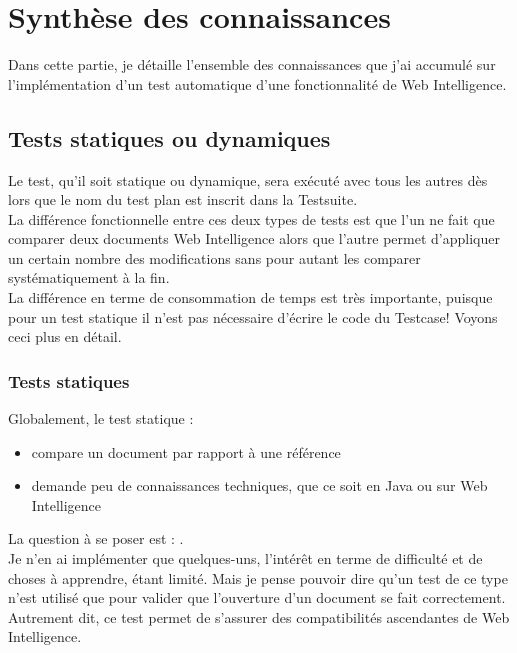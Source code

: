 

\section{Synth\`{e}se des connaissances}
Dans cette partie, je d\'{e}taille l'ensemble des connaissances que j'ai accumul\'{e} sur l'impl\'{e}mentation d'un test automatique d'une fonctionnalit\'{e} de Web Intelligence.\\

\subsection{Tests statiques ou dynamiques}

Le test, qu'il soit statique ou dynamique, sera ex\'{e}cut\'{e} avec tous les autres d\`{e}s lors que le nom du test plan est inscrit dans la \gls{Testsuite}.\\
La diff\'{e}rence fonctionnelle entre ces deux types de tests est que l'un ne fait que comparer deux documents Web Intelligence alors que l'autre permet d'appliquer un certain nombre des modifications sans pour autant les comparer syst\'{e}matiquement \`{a} la fin.\\
La diff\'{e}rence en terme de consommation de temps est tr\`{e}s importante, puisque pour un test statique il n'est pas n\'{e}cessaire d'\'{e}crire le code du \gls{Testcase}! Voyons ceci plus en d\'{e}tail.

\subsubsection{Tests statiques}
Globalement, le test statique :

\begin{itemize}
	\item compare un document par rapport \`{a} une r\'{e}f\'{e}rence
	\item demande peu de connaissances techniques, que ce soit en \gls{Java} ou sur Web Intelligence
\end{itemize}

La question \`{a} se poser est : .\\
Je n'en ai impl\'{e}menter que quelques-uns, l'int\'{e}r\^{e}t en terme de difficult\'{e} et de choses \`{a} apprendre, \'{e}tant limit\'{e}. Mais je pense pouvoir dire qu'un test de ce type n'est utilis\'{e} que pour valider que l'ouverture d'un document se fait correctement. Autrement dit, ce test permet de s'assurer des compatibilit\'{e}s ascendantes de Web Intelligence.\\

